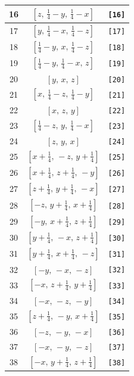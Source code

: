 \documentclass[fleqn,8pt]{jsarticle}
\begin{document}
\begin{longtable}{ccc}
16 & $\left[ z,\, \frac{1}{4} - y,\, \frac{1}{4} - x \right]$ & {\tt [16]} \\ \hline
17 & $\left[ y,\, \frac{1}{4} - x,\, \frac{1}{4} - z \right]$ & {\tt [17]} \\ \hline
18 & $\left[ \frac{1}{4} - y,\, x,\, \frac{1}{4} - z \right]$ & {\tt [18]} \\ \hline
19 & $\left[ \frac{1}{4} - y,\, \frac{1}{4} - x,\, z \right]$ & {\tt [19]} \\ \hline
20 & $\left[ y,\, x,\, z \right]$ & {\tt [20]} \\ \hline
21 & $\left[ x,\, \frac{1}{4} - z,\, \frac{1}{4} - y \right]$ & {\tt [21]} \\ \hline
22 & $\left[ x,\, z,\, y \right]$ & {\tt [22]} \\ \hline
23 & $\left[ \frac{1}{4} - z,\, y,\, \frac{1}{4} - x \right]$ & {\tt [23]} \\ \hline
24 & $\left[ z,\, y,\, x \right]$ & {\tt [24]} \\ \hline
25 & $\left[ x + \frac{1}{4},\, - z,\, y + \frac{1}{4} \right]$ & {\tt [25]} \\ \hline
26 & $\left[ x + \frac{1}{4},\, z + \frac{1}{4},\, - y \right]$ & {\tt [26]} \\ \hline
27 & $\left[ z + \frac{1}{4},\, y + \frac{1}{4},\, - x \right]$ & {\tt [27]} \\ \hline
28 & $\left[ - z,\, y + \frac{1}{4},\, x + \frac{1}{4} \right]$ & {\tt [28]} \\ \hline
29 & $\left[ - y,\, x + \frac{1}{4},\, z + \frac{1}{4} \right]$ & {\tt [29]} \\ \hline
30 & $\left[ y + \frac{1}{4},\, - x,\, z + \frac{1}{4} \right]$ & {\tt [30]} \\ \hline
31 & $\left[ y + \frac{1}{4},\, x + \frac{1}{4},\, - z \right]$ & {\tt [31]} \\ \hline
32 & $\left[ - y,\, - x,\, - z \right]$ & {\tt [32]} \\ \hline
33 & $\left[ - x,\, z + \frac{1}{4},\, y + \frac{1}{4} \right]$ & {\tt [33]} \\ \hline
34 & $\left[ - x,\, - z,\, - y \right]$ & {\tt [34]} \\ \hline
35 & $\left[ z + \frac{1}{4},\, - y,\, x + \frac{1}{4} \right]$ & {\tt [35]} \\ \hline
36 & $\left[ - z,\, - y,\, - x \right]$ & {\tt [36]} \\ \hline
37 & $\left[ - x,\, - y,\, - z \right]$ & {\tt [37]} \\ \hline
38 & $\left[ - x,\, y + \frac{1}{4},\, z + \frac{1}{4} \right]$ & {\tt [38]} \\ \hline

\end{longtable}
\end{document}
